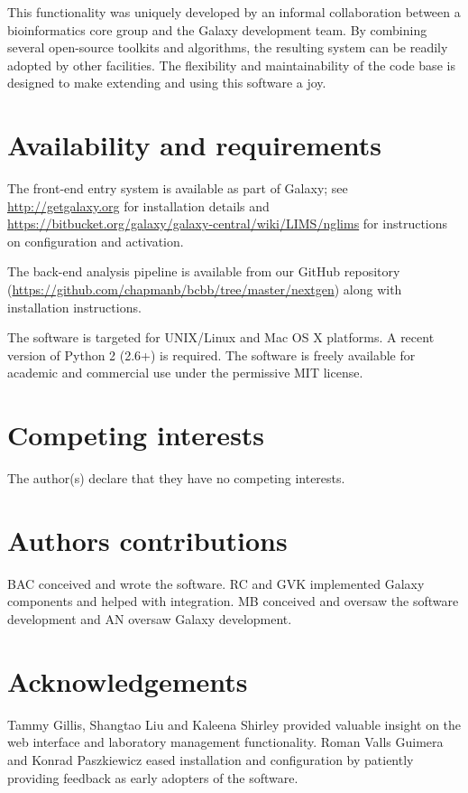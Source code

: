 \documentclass[10pt]{bmc_article}
\newenvironment{bmcformat}{\begin{raggedright}\baselineskip20pt\sloppy\setboolean{publ}{false}}{\end{raggedright}\baselineskip20pt\sloppy}
\begin{document}
\begin{bmcformat}
This functionality was uniquely developed by an informal collaboration
between a bioinformatics core group and the Galaxy development
team. By combining several open-source toolkits and algorithms, the
resulting system can be readily adopted by other facilities. The
flexibility and maintainability of the code base is designed to make
extending and using this software a joy.

\section*{Availability and requirements}

The front-end entry system is available as part of Galaxy; see
\url{http://getgalaxy.org} for installation details and
\url{https://bitbucket.org/galaxy/galaxy-central/wiki/LIMS/nglims} for
instructions on configuration and activation.

The back-end analysis pipeline is available from our GitHub repository
(\url{https://github.com/chapmanb/bcbb/tree/master/nextgen}) along
with installation instructions.

The software is targeted for UNIX/Linux and Mac OS X platforms. A
recent version of Python 2 (2.6+) is required. The software is
freely available for academic and commercial use under the
permissive MIT license.

\section*{Competing interests}

The author(s) declare that they have no competing interests.

\section*{Authors contributions}

BAC conceived and wrote the software. RC and GVK implemented
Galaxy components and helped with integration. MB conceived and oversaw the software
development and AN oversaw Galaxy development.

\section*{Acknowledgements}
  Tammy Gillis, Shangtao Liu and Kaleena Shirley provided
  valuable insight on the web interface and laboratory management
  functionality. Roman Valls Guimera and Konrad Paszkiewicz eased
  installation and configuration by patiently providing feedback
  as early adopters of the software.


\end{bmcformat}
\end{document}
